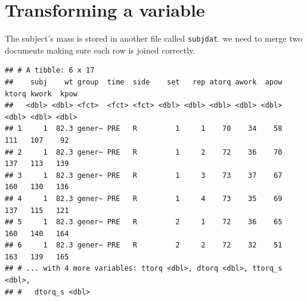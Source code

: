 \documentclass[
]{book}
\newenvironment{Shaded}{\begin{snugshade}}{\end{snugshade}}
\newcommand{\CommentTok}[1]{\textcolor[rgb]{0.56,0.35,0.01}{\textit{#1}}}
\newcommand{\DataTypeTok}[1]{\textcolor[rgb]{0.13,0.29,0.53}{#1}}
\newcommand{\KeywordTok}[1]{\textcolor[rgb]{0.13,0.29,0.53}{\textbf{#1}}}
\newcommand{\NormalTok}[1]{#1}
\newcommand{\OperatorTok}[1]{\textcolor[rgb]{0.81,0.36,0.00}{\textbf{#1}}}
\newcommand{\StringTok}[1]{\textcolor[rgb]{0.31,0.60,0.02}{#1}}
\begin{document}
\hypertarget{transforming-a-variable}{%
\section{Transforming a variable}\label{transforming-a-variable}}

The subject's mass is stored in another file called \texttt{subjdat}. we need to merge two documents making sure each row is joined correctly.

\begin{Shaded}
\end{Shaded}

\begin{verbatim}
## # A tibble: 6 x 17
##    subj    wt group  time  side    set   rep atorq awork  apow ktorq kwork  kpow
##   <dbl> <dbl> <fct>  <fct> <fct> <dbl> <dbl> <dbl> <dbl> <dbl> <dbl> <dbl> <dbl>
## 1     1  82.3 gener~ PRE   R         1     1    70    34    58   111   107    92
## 2     1  82.3 gener~ PRE   R         1     2    72    36    70   137   113   139
## 3     1  82.3 gener~ PRE   R         1     3    73    37    67   160   130   136
## 4     1  82.3 gener~ PRE   R         1     4    73    35    69   137   115   121
## 5     1  82.3 gener~ PRE   R         2     1    72    36    65   160   140   164
## 6     1  82.3 gener~ PRE   R         2     2    72    32    51   163   139   165
## # ... with 4 more variables: ttorq <dbl>, dtorq <dbl>, ttorq_s <dbl>,
## #   dtorq_s <dbl>
\end{verbatim}
\end{document}

